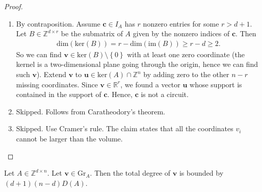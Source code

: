 \documentclass[a4paper, 11pt]{article}
\begin{document}
\begin{proof}\(  \)
  \begin{enumerate}
    \item By contraposition. Assume \( \mathbf{c} \in I_A \) has \( r \) nonzero entries for some \( r > d + 1 \). Let \( B \in \mathbb Z^{d \times r} \) be the submatrix of \( A \) given by the nonzero indices of \( \mathbf c \). Then 
    \begin{align*}
      \mathrm{dim}( \mathrm{ker}(B) ) = r - \mathrm{dim}(\mathrm{im}(B)) \geq r - d \geq 2.
    \end{align*}
    So we can find \( \mathbf v \in \mathrm{ker}(B) \setminus \left\{ 0 \right\} \) with at least one zero coordinate (the kernel is a two-dimensional plane going through the origin, hence we can find such \( \mathbf v \)). Extend \( \mathbf v \) to \( \mathbf u \in \mathrm{ker}(A) \cap \mathbb Z^n \) by adding zero to the other \( n-r \) missing coordinates. Since \( \mathbf v \in \mathbb R^r \), we found a vector \( \mathbf u \) whose support is contained in the support of \( \mathbf c \). Hence, \( \mathbf c \) is not a circuit.
    \item Skipped. Follows from Caratheodory's theorem.
    \item Skipped. Use Cramer's rule. The claim states that all the coordinates \( v_i \) cannot be larger than the volume.
  \end{enumerate}
\end{proof}


\begin{mdframed}
\begin{thm}
  Let \( A \in \mathbb Z^{d \times n} \).
  Let \( \mathbf v \in \mathrm{Gr}_A \). Then the total degree of \( \mathbf v \) is bounded by \( (d + 1)(n - d)D(A) \).
\end{thm}
\end{mdframed}
\end{document}
